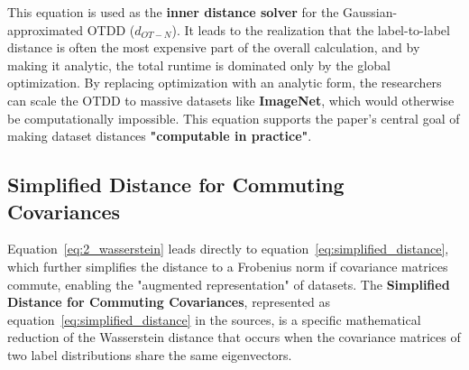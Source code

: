 \documentclass[11pt, a4paper]{article}
\theoremstyle{plain} %
\theoremstyle{definition} %
\begin{document}
			This equation is used as the \textbf{inner distance solver} for the Gaussian-approximated OTDD ($d_{OT-N}$). It leads to the realization that the label-to-label distance is often the most expensive part of the overall calculation, and by making it analytic, the total runtime is dominated only by the global optimization. By replacing optimization with an analytic form, the researchers can scale the OTDD to massive datasets like \textbf{ImageNet}, which would otherwise be computationally impossible. This equation supports the paper's central goal of making dataset distances \textbf{"computable in practice"}.


		\subsection{Simplified Distance for Commuting Covariances}
		\label{sec:simplified_distance_for_commuting_covariances}
			Equation~\ref{eq:2_wasserstein} leads directly to equation~\ref{eq:simplified_distance}, which further simplifies the distance to a Frobenius norm if covariance matrices commute, enabling the "augmented representation" of datasets. The \textbf{Simplified Distance for Commuting Covariances}, represented as equation~\ref{eq:simplified_distance} in the sources, is a specific mathematical reduction of the Wasserstein distance that occurs when the covariance matrices of two label distributions share the same eigenvectors.
\end{document}
